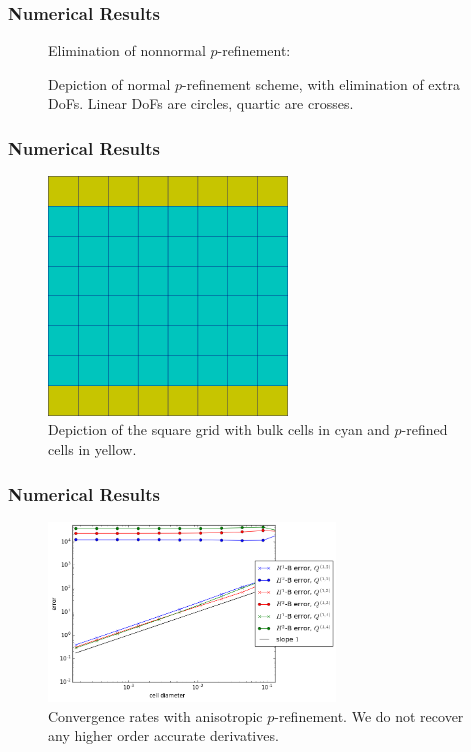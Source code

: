 \documentclass[8pt]{beamer}
\begin{document}
\begin{frame}
    \frametitle{Numerical Results}
    \begin{figure}
        \centering
        Elimination of nonnormal \(p\)-refinement:
        
        \caption{Depiction of normal \(p\)-refinement scheme, with elimination
        of extra DoFs. Linear DoFs are circles, quartic are crosses.}
    \end{figure}
\end{frame}

\begin{frame}
    \frametitle{Numerical Results}
    \begin{figure}
        \centering
        \includegraphics[width=2.5in]{Pictures/square-periodic-grid.png}

        \caption{Depiction of the square grid with bulk cells in cyan and
        \(p\)-refined cells in yellow.}
    \end{figure}
\end{frame}

\begin{frame}
    \frametitle{Numerical Results}
    \begin{figure}
        \centering
        \includegraphics[width=3in]{Pictures/periodic-dont-eliminate-nonnormal-convergence.png}

        \caption{Convergence rates with anisotropic \(p\)-refinement. We do not
        recover any higher order accurate derivatives.}
    \end{figure}
\end{frame}
\end{document}
